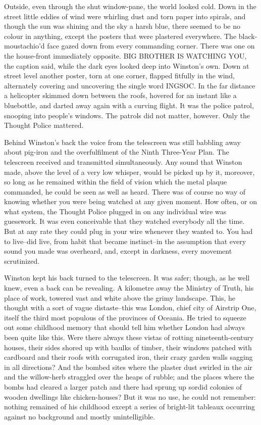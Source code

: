 \documentclass{article}
\begin{document}
Outside, even through the shut window-pane, the world looked cold. Down in
the street little eddies of wind were whirling dust and torn paper into
spirals, and though the sun was shining and the sky a harsh blue, there
seemed to be no colour in anything, except the posters that were plastered
everywhere. The black-moustachio'd face gazed down from every commanding
corner. There was one on the house-front immediately opposite. BIG BROTHER
IS WATCHING YOU, the caption said, while the dark eyes looked deep into
Winston's own. Down at street level another poster, torn at one corner,
flapped fitfully in the wind, alternately covering and uncovering the
single word INGSOC. In the far distance a helicopter skimmed down between
the roofs, hovered for an instant like a bluebottle, and darted away again
with a curving flight. It was the police patrol, snooping into people's
windows. The patrols did not matter, however. Only the Thought Police
mattered.

Behind Winston's back the voice from the telescreen was still babbling away
about pig-iron and the overfulfilment of the Ninth Three-Year Plan. The
telescreen received and transmitted simultaneously. Any sound that Winston
made, above the level of a very low whisper, would be picked up by it,
moreover, so long as he remained within the field of vision which the metal
plaque commanded, he could be seen as well as heard. There was of course
no way of knowing whether you were being watched at any given moment. How
often, or on what system, the Thought Police plugged in on any individual
wire was guesswork. It was even conceivable that they watched everybody all
the time. But at any rate they could plug in your wire whenever they wanted
to. You had to live--did live, from habit that became instinct--in the
assumption that every sound you made was overheard, and, except in
darkness, every movement scrutinized.

Winston kept his back turned to the telescreen. It was safer; though, as he
well knew, even a back can be revealing. A kilometre away the Ministry of
Truth, his place of work, towered vast and white above the grimy landscape.
This, he thought with a sort of vague distaste--this was London, chief
city of Airstrip One, itself the third most populous of the provinces of
Oceania. He tried to squeeze out some childhood memory that should tell him
whether London had always been quite like this. Were there always these
vistas of rotting nineteenth-century houses, their sides shored up with
baulks of timber, their windows patched with cardboard and their roofs
with corrugated iron, their crazy garden walls sagging in all directions?
And the bombed sites where the plaster dust swirled in the air and the
willow-herb straggled over the heaps of rubble; and the places where the
bombs had cleared a larger patch and there had sprung up sordid colonies
of wooden dwellings like chicken-houses? But it was no use, he could not
remember: nothing remained of his childhood except a series of bright-lit
tableaux occurring against no background and mostly unintelligible.
\end{document}
